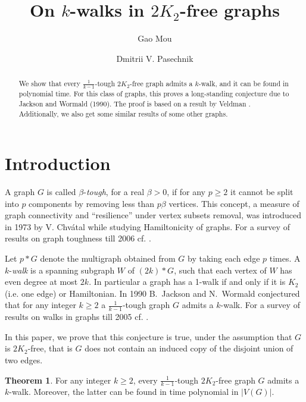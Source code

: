 \documentclass{amsart}
\theoremstyle{definition}
\newtheorem{theorem}{Theorem}
\begin{document}
\author{Gao Mou}
\address{School of Physical and Mathematical Sciences, Nanyang Technological University, Singapore} 
\author{Dmitrii V. Pasechnik}
\address{Department of Computer Science, The University of Oxford, UK}

\title{On $k$-walks in $2K_2$-free graphs}
\begin{abstract}
We show that every $\frac{1}{k-1}$-tough
$2K_2$-free graph admits a $k$-walk, and it can be found in polynomial time. 
For this class of graphs, this proves a
long-standing conjecture due to Jackson and Wormald (1990). The proof is based on a result by Veldman \cite{veldman83}.
Additionally, we also get some similar results of some other graphs.
\end{abstract}

\maketitle

\section{Introduction}
A graph $G$ is called $\beta$-{\em tough}, for a real $\beta>0$, if for any $p\geq 2$ it
cannot be split into $p$ components by removing less than $p\beta$ vertices.  
This concept, a measure of graph connectivity and ``resilience'' under vertex subsets removal,
was introduced in 1973 by V. Chv\'{a}tal 
while studying   Hamiltonicity of graphs. For a survey of results on graph toughness till 2006
cf. \cite{MR2221006}.

Let $p*G$ denote the multigraph obtained from $G$ by taking each edge $p$ times. 
A $k$-{\em walk} is a spanning subgraph $W$ of $(2k)*G$, such that each vertex of $W$ 
has even degree at most $2k$. %
In particular a graph has a 1-walk if and only if it is $K_2$ (i.e. one edge) or Hamiltonian.
In 1990 B.~Jackson and N.~Wormald conjectured \cite{jackson1990k} that for any integer $k\ge2$ a
$\frac{1}{k-1}$-tough graph $G$ admits a $k$-walk.
{For a survey of results on walks in graphs till 2005 cf. \cite{kouider2005connected}.}

In this paper, we prove that this conjecture is true, under the
assumption that $G$ is  $2K_2$-free, that is $G$ does not contain an induced
copy of the disjoint union of two edges. 
\begin{theorem}\label{thm2} 
For any integer $k\ge2$, every
$\frac{1}{k-1}$-tough $2K_2$-free graph $G$
admits a $k$-walk.
Moreover, the latter can be found in time polynomial in $|V(G)|$.
\end{theorem}
\end{document}
